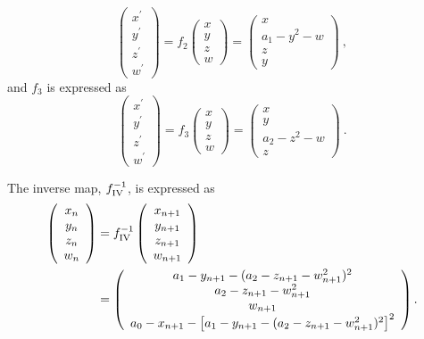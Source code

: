 \documentclass[12pt]{iopart}
\begin{document}
\begin{equation}\label{eq:f_2}
\left( \begin{array}{ccc}
x^{\prime}\\
y^{\prime} \\
z^{\prime} \\
w^{\prime} \end{array} \right) = 
f_2 \left( \begin{array}{ccc}
x\\
y \\
z \\
w \end{array} \right) =
\left( \begin{array}{ccc}
x\\
a_1 - y^2 - w\\
z \\
y \end{array} \right)\ ,
\end{equation}
and $f_3$ is expressed as
\begin{equation}\label{eq:f_3}
\left( \begin{array}{ccc}
x^{\prime}\\
y^{\prime} \\
z^{\prime} \\
w^{\prime} \end{array} \right) = 
f_3 \left( \begin{array}{ccc}
x\\
y \\
z \\
w \end{array} \right) =
\left( \begin{array}{ccc}
x\\
y\\
a_2 - z^2 - w\\
z \end{array} \right)\ .
\end{equation}

The inverse map, $f^{-1}_{\rm IV}$, is expressed as
\begin{eqnarray}\label{eq:4D triply folded Henon inverse}
\left( \begin{array}{ccc}
x_{n}\\
y_{n} \\
z_{n} \\
w_{n} \end{array} \right) &= 
f^{-1}_{\rm IV} \left( \begin{array}{ccc}
x_{n+1}\\
y_{n+1} \\
z_{n+1} \\
w_{n+1} \end{array} \right) \nonumber \\
&=
\left( \begin{array}{ccc}
a_1 - y_{n+1} - (a_2 - z_{n+1} - w^2_{n+1})^2\\
a_2 - z_{n+1} - w^2_{n+1}\\
w_{n+1}\\
a_0 - x_{n+1} - \left[ a_1 - y_{n+1} - (a_2 - z_{n+1} - w^2_{n+1})^2 \right]^2 \end{array} \right).
\end{eqnarray}
\end{document}
